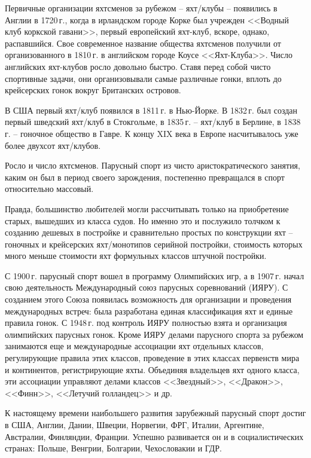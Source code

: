 \documentclass[a4paper, 12pt, twoside, final]{scrbook}
\begin{document}
Первичные организации яхтсменов за рубежом \--- яхт\-/клубы \--- появились
в Англии в 1720\,г., когда в ирландском городе Корке был учрежден <<Водный
клуб коркской гавани>>, первый европейский яхт-клуб, вскоре, однако,
распавшийся. Свое современное название общества яхтсменов получили
от организованного в 1810\,г. в английском городе Коусе <<Яхт-Клуба>>.
Число английских яхт-клубов росло довольно быстро. Ставя перед собой
чисто спортивные задачи, они организовывали самые различные гонки,
вплоть до крейсерских гонок вокруг Британских островов.{\sloppy\par}

В США первый яхт\-/клуб появился в 1811\,г. в Нью-Йорке. В 1832\,г. был
создан первый шведский яхт\-/клуб в Стокгольме, в 1835\,г. \--- яхт\-/клуб
в Берлине, в 1838\,г. \--- гоночное общество в Гавре. К концу XIX века в
Европе насчитывалось уже более двухсот яхт\-/клубов.

Росло и число яхтсменов. Парусный спорт из чисто аристократического
занятия, каким он был в период своего зарождения, постепенно превращался
в спорт относительно массовый.

Правда, большинство любителей могли рассчитывать только на приобретение
старых, вышедших из класса судов. Но именно это и послужило толчком
к созданию дешевых в постройке и сравнительно простых по конструкции
яхт \--- гоночных и крейсерских яхт\-/монотипов серийной постройки, стоимость
которых много меньше стоимости яхт формульных классов штучной постройки.

С 1900\,г. парусный спорт вошел в программу Олимпийских игр, а в 1907\,г.
начал свою деятельность Международный союз парусных соревнований (ИЯРУ).
С созданием этого Союза появилась возможность для организации и проведения
международных встреч: была разработана единая классификация яхт и
единые правила гонок. С 1948\,г. под контроль ИЯРУ полностью взята
и организация олимпийских парусных гонок. Кроме ИЯРУ делами парусного
спорта за рубежом занимаются еще и международные ассоциации яхт отдельных
классов, регулирующие правила этих классов, проведение в этих классах
первенств мира и континентов, регистрирующие яхты. Объединяя владельцев
яхт одного класса, эти ассоциации управляют делами классов <<Звездный>>,
<<Дракон>>, <<Финн>>, <<Летучий голландец>> и др. 

К настоящему времени наибольшего развития зарубежный парусный спорт
достиг в США, Англии, Дании, Швеции, Норвегии, ФРГ, Италии, Аргентине,
Австралии, Финляндии, Франции. Успешно развивается он и в социалистических
странах: Польше, Венгрии, Болгарии, Чехословакии и ГДР. 
\end{document}
